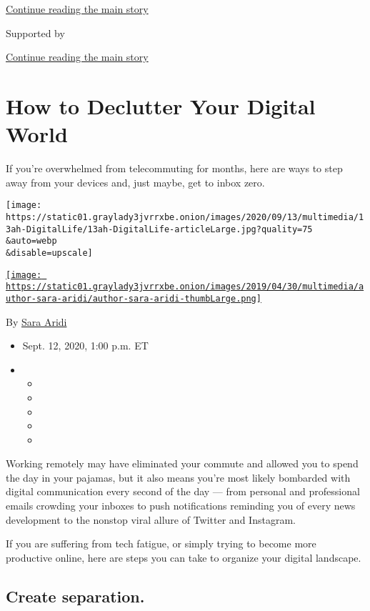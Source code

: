 \protect\hyperlink{after-top}{Continue reading the main story}

Supported by

\protect\hyperlink{after-sponsor}{Continue reading the main story}

\hypertarget{how-to-declutter-your-digital-world}{%
\section{How to Declutter Your Digital
World}\label{how-to-declutter-your-digital-world}}

If you're overwhelmed from telecommuting for months, here are ways to
step away from your devices and, just maybe, get to inbox zero.

\texttt{[image: https://static01.graylady3jvrrxbe.onion/images/2020/09/13/multimedia/13ah-DigitalLife/13ah-DigitalLife-articleLarge.jpg?quality=75\\\&auto=webp\\\&disable=upscale]}

\href{https://www.nytimes3xbfgragh.onion/by/sara-aridi}{\texttt{[image: https://static01.graylady3jvrrxbe.onion/images/2019/04/30/multimedia/author-sara-aridi/author-sara-aridi-thumbLarge.png]}}

By \href{https://www.nytimes3xbfgragh.onion/by/sara-aridi}{Sara Aridi}

\begin{itemize}
\item
  Sept. 12, 2020, 1:00 p.m. ET
\item
  \begin{itemize}
  \item
  \item
  \item
  \item
  \item
  \end{itemize}
\end{itemize}

Working remotely may have eliminated your commute and allowed you to
spend the day in your pajamas, but it also means you're most likely
bombarded with digital communication every second of the day --- from
personal and professional emails crowding your inboxes to push
notifications reminding you of every news development to the nonstop
viral allure of Twitter and Instagram.

If you are suffering from tech fatigue, or simply trying to become more
productive online, here are steps you can take to organize your digital
landscape.

\hypertarget{create-separation}{%
\subsection{Create separation.}\label{create-separation}}

